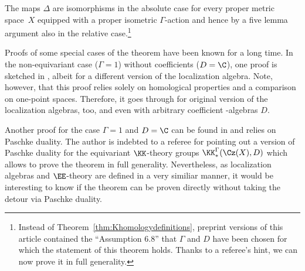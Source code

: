\begin{thm}\label{thm:Khomologydefinitions}
The maps $\Delta$ are isomorphisms in the absolute case for every proper metric space~$X$ equipped with a proper isometric $\Gamma$-action and hence by a five lemma argument also in the relative case.\footnote{Instead of Theorem~\ref{thm:Khomologydefinitions}, preprint versions of this article contained the ``Assumption 6.8'' that $\Gamma$ and $D$ have been chosen for which the statement of this theorem holds. Thanks to a referee's hint, we can now prove it in full generality.}
\end{thm}

Proofs of some special cases of the theorem have been known for a long time.
In the non-equivariant case ($\Gamma=1$) without coefficients ($D=\C$), one proof is sketched in \cite[Construction~6.7.5, Exercises~B.3.2 and~B.3.3]{WillettYuHigherIndexTheory}, albeit for a different version of the localization algebra. Note, however, that this proof relies solely on homological properties and a comparison on one-point spaces. Therefore, it goes through for original version of the localization algebras, too, and even with arbitrary coefficient \textCstar-algebras $D$.

Another proof for the case $\Gamma=1$ and $D=\C$ can be found in \cite[Proposition~4.3]{QiaoRoe} and relies on Paschke duality. The author is indebted to a referee for pointing out a version of Paschke duality for the equivariant $\KK$-theory groups $\KK^\Gamma_*(\Cz(X),D)$ which allows to prove the theorem in full generality.
Nevertheless, as localization algebras and $\EE$-theory are defined in a very similiar manner, it would be interesting to know if the theorem can be proven directly without taking the detour via Paschke duality.

